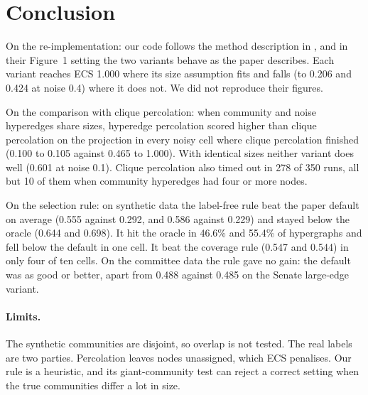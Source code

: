 \documentclass[11pt,a4paper]{article}
\begin{document}
\section{Conclusion}
On the re-implementation: our code follows the method description in \cite{kovacs2025}, and in their Figure~1 setting the two variants behave as the paper describes. Each variant reaches ECS 1.000 where its size assumption fits and falls (to 0.206 and 0.424 at noise 0.4) where it does not. We did not reproduce their figures.

On the comparison with clique percolation: when community and noise hyperedges share sizes, hyperedge percolation scored higher than clique percolation on the projection in every noisy cell where clique percolation finished (0.100 to 0.105 against 0.465 to 1.000). With identical sizes neither variant does well (0.601 at noise 0.1). Clique percolation also timed out in 278 of 350 runs, all but 10 of them when community hyperedges had four or more nodes.

On the selection rule: on synthetic data the label-free rule beat the paper default on average (0.555 against 0.292, and 0.586 against 0.229) and stayed below the oracle (0.644 and 0.698). It hit the oracle in 46.6\% and 55.4\% of hypergraphs and fell below the default in one cell. It beat the coverage rule (0.547 and 0.544) in only four of ten cells. On the committee data the rule gave no gain: the default was as good or better, apart from 0.488 against 0.485 on the Senate large-edge variant.

\paragraph{Limits.} The synthetic communities are disjoint, so overlap is not tested. The real labels are two parties. Percolation leaves nodes unassigned, which ECS penalises. Our rule is a heuristic, and its giant-community test can reject a correct setting when the true communities differ a lot in size.


{\small\setlength{\itemsep}{0pt}}
\end{document}
